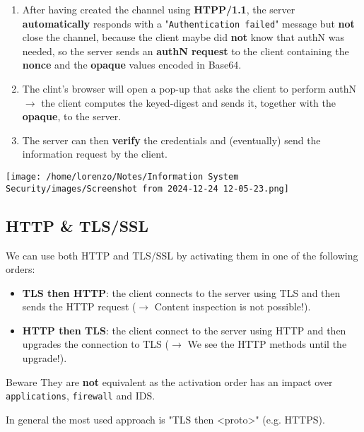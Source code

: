 \begin{minipage}{0.5\textwidth}
    \begin{enumerate}
        \item After having created the channel using \textbf{HTPP/1.1}, the server \textbf{automatically} responds with a "\texttt{Authentication failed}" message but \textbf{not} close the channel, because the client maybe did \textbf{not} know that authN was needed, so the server sends an \textbf{authN request} to the client containing the \textbf{nonce} and the \textbf{opaque} values encoded in Base64.
        \item The clint's browser will open a pop-up that asks the client to perform authN \(\rightarrow\) the client computes the keyed-digest and sends it, together with the \textbf{opaque}, to the server. 
        \item The server can then \textbf{verify} the credentials and (eventually) send the information request by the client.
    \end{enumerate} 
\end{minipage} 
\hspace{0.3cm}
\begin{minipage}{0.5\textwidth}
    \centering
    \texttt{[image: /home/lorenzo/Notes/Information System Security/images/Screenshot from 2024-12-24 12-05-23.png]}
\end{minipage}

\newpage
\subsection{HTTP \& TLS/SSL}
We can use both HTTP and TLS/SSL by activating them in one of the following orders:
\begin{itemize}
    \item \textbf{TLS then HTTP}: the client connects to the server using TLS and then sends the HTTP request (\(\rightarrow\) Content inspection is not possible!).
    \item \textbf{HTTP then TLS}: the client connect to the server using HTTP and then upgrades the connection to TLS (\(\rightarrow\) We see the HTTP methods until the upgrade!).
\end{itemize}
\begin{quotebox-red}{Beware}
They are \textbf{not} equivalent as the activation order has an impact over \texttt{applications}, \texttt{firewall} and IDS.
\end{quotebox-red}
In general the most used approach is "TLS then <proto>" (e.g. HTTPS).

